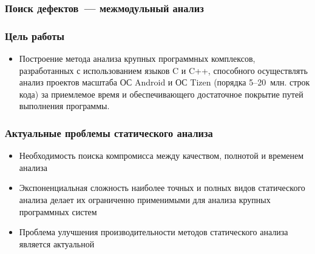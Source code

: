 \documentclass[14pt]{beamer}
\begin{document}
\begin{frame}
\frametitle{Поиск дефектов~--- межмодульный анализ}
\begin{figure}[h]
\end{figure}
\end{frame}


\begin{frame}
\frametitle{Цель работы}
\begin{itemize}
  \item Построение метода анализа крупных программных комплексов, разработанных с использованием языков C и C++, способного осуществлять анализ проектов масштаба ОС Android и ОС Tizen (порядка 5--20~млн. строк кода) за приемлемое время и обеспечивающего достаточное покрытие путей выполнения программы.
\end{itemize}
\end{frame}

\begin{frame}
\frametitle{Актуальные проблемы статического анализа}
\begin{itemize}
  \item Необходимость поиска компромисса между качеством, полнотой и временем анализа
  \item Экспоненциальная сложность наиболее точных и полных видов статического анализа делает их ограниченно применимыми для анализа крупных программных систем
  \item Проблема улучшения производительности методов статического анализа является актуальной   
\end{itemize}
\end{frame}
\end{document}

